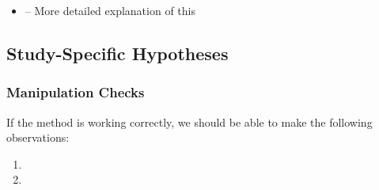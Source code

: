 \begin{itemize}
\item {} -- More detailed explanation of this

\end{itemize}


\subsection{Study-Specific Hypotheses}


\begin{hypothesis}\label{hyp:Exp2:H1ShortName}
\end{hypothesis}




\subsubsection{Manipulation Checks}
If the method is working correctly, we should be able to make the following observations:
\begin{enumerate}[label=\textsc{MC\arabic*}:]
	\item {}
	
	\item {}
\end{enumerate}
